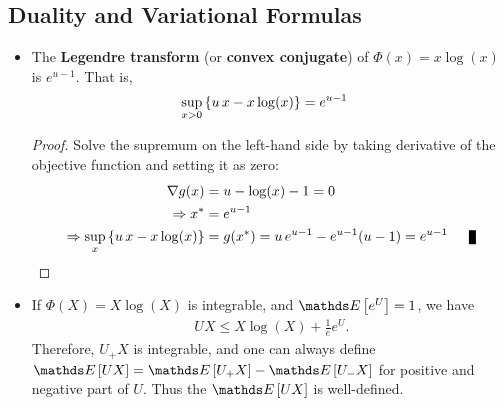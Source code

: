 \documentclass[11pt]{article}
\begin{document}
\subsection{Duality and Variational Formulas}
\begin{itemize}
\item \begin{lemma}
The \textbf{Legendre transform} (or \textbf{convex conjugate}) of $\Phi(x) = x\log(x)$ is $e^{u-1}$. That is,
\begin{align*}
\sup_{x > 0}\left\{u\,x - x\log(x)\right\} &= e^{u-1}
\end{align*}
\end{lemma}
\begin{proof}
Solve the supremum on the left-hand side by taking derivative of the objective function and setting it as zero:
\begin{align*}
\nabla g(x) &= u - \log(x) - 1 = 0\\
\Rightarrow x^{*} &= e^{u-1} \\
\Rightarrow \sup_{x}\set{u\,x - x\log(x)} &= g(x^{*}) = u\,e^{u-1} - e^{u-1}(u-1) = e^{u-1} \qed
\end{align*}
\end{proof}

\item \begin{remark}
If $\Phi(X) = X\log(X)$ is integrable, and $\E{}{e^{U}} = 1$, we have
\begin{align*}
UX \le X\log(X) + \frac{1}{e}e^{U}.
\end{align*} Therefore, $U_{+}X$ is integrable, and one can always define $\E{}{UX} = \E{}{U_{+}X} - \E{}{U_{-}X}$ for positive and negative part of $U$. Thus the $\E{}{UX}$ is well-defined.
\end{remark}


\end{itemize}
\end{document}
